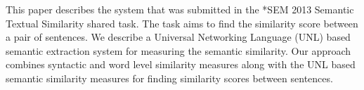 This paper describes the system that was submitted in the *SEM 2013 Semantic Textual Similarity shared task. The task aims to find the similarity score
 between a pair of sentences.  We describe a Universal Networking Language (UNL)
 based semantic extraction system for measuring the semantic similarity. Our
 approach combines syntactic and word level similarity measures along with the
 UNL based semantic similarity measures for finding similarity scores between
 sentences.

